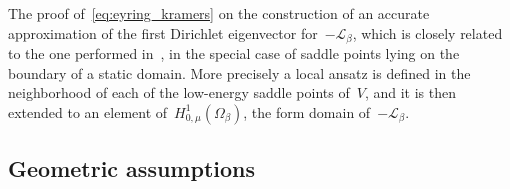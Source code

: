 \documentclass[10pt]{article}
\newcommand{\cL}{\mathcal{L}}
\renewcommand{\d}{\mathrm{d}}
\newcommand{\e}{\mathrm{e}}
\newcommand{\1}{\mathbbm 1}
\newcommand{\deltai}{\delta^{(i)}}
\begin{document}
    The proof of~\eqref{eq:eyring_kramers} on the construction of an accurate approximation of the first Dirichlet eigenvector for~$-\cL_\beta$, which is closely related to the one performed in~\cite{LPN21}, in the special case of saddle points lying on the boundary of a static domain.
    More precisely a local ansatz is defined in the neighborhood of each of the low-energy saddle points of~$V$, and it is then extended to an element of~$H_{0,\mu}^1(\Omega_\beta)$, the form domain of~$-\cL_\beta$.
    \subsection{Geometric assumptions}
        
        
\end{document}

